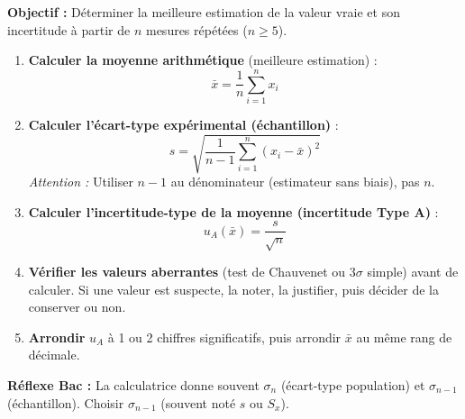 \documentclass[11pt]{article}
\begin{document}
\begin{methode}
    \textbf{Objectif :} Déterminer la meilleure estimation de la valeur vraie et son incertitude à partir de $n$ mesures répétées ($n \ge 5$).
    \begin{enumerate}
        \item \textbf{Calculer la moyenne arithmétique} (meilleure estimation) :
              \[ \bar{x} = \frac{1}{n} \sum_{i=1}^n x_i \]
        \item \textbf{Calculer l'écart-type expérimental (échantillon)} :
              \[ s = \sqrt{ \frac{1}{n-1} \sum_{i=1}^n (x_i - \bar{x})^2 } \]
              \emph{Attention :} Utiliser $n-1$ au dénominateur (estimateur sans biais), pas $n$.
        \item \textbf{Calculer l'incertitude-type de la moyenne (incertitude Type A)} :
              \[ u_A(\bar{x}) = \frac{s}{\sqrt{n}} \]
        \item \textbf{Vérifier les valeurs aberrantes} (test de Chauvenet ou $3\sigma$ simple) avant de calculer. Si une valeur est suspecte, la noter, la justifier, puis décider de la conserver ou non.
        \item \textbf{Arrondir} $u_A$ à 1 ou 2 chiffres significatifs, puis arrondir $\bar{x}$ au même rang de décimale.
    \end{enumerate}
    \textbf{Réflexe Bac :} La calculatrice donne souvent $\sigma_n$ (écart-type population) et $\sigma_{n-1}$ (échantillon). Choisir \textbf{$\sigma_{n-1}$} (souvent noté $s$ ou $S_x$).
\end{methode}
\end{document}
